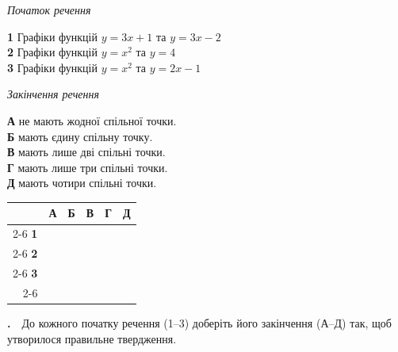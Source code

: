 \documentclass[12pt]{article}
\newcommand{\matchingGrid}{%
    \begingroup
    \renewcommand{\arraystretch}{1.15}
    \setlength{\tabcolsep}{4pt}
    \footnotesize
    \begin{tabular}{r|c|c|c|c|c|}
         \multicolumn{1}{c}{} & \multicolumn{1}{c}{\textbf{А}} & \multicolumn{1}{c}{\textbf{Б}} & \multicolumn{1}{c}{\textbf{В}} & \multicolumn{1}{c}{\textbf{Г}} & \multicolumn{1}{c}{\textbf{Д}} \\ \cline{2-6}
         \textbf{1} & \phantom{X} & \phantom{X} & \phantom{X} & \phantom{X} & \phantom{X} \\ \cline{2-6}
         \textbf{2} & & & & & \\ \cline{2-6}
         \textbf{3} & & & & & \\ \cline{2-6}
    \end{tabular}
    \endgroup
}
\newcounter{zad}
\newcommand{\zadnum}{\stepcounter{zad}\textbf{\thezad.}\ \ }
\begin{document}
\vspace{0.3cm}
\noindent
\begin{minipage}[t]{0.42\textwidth}
\textit{Початок речення}\par\vspace{0.2cm}
\textbf{1} \quad Графіки функцій $y = 3x + 1$ та $y = 3x - 2$\\[0.3cm]
\textbf{2} \quad Графіки функцій $y = x^2$ та $y = 4$\\[0.3cm]
\textbf{3} \quad Графіки функцій $y = x^2$ та $y = 2x - 1$
\end{minipage}
\hfill
\begin{minipage}[t]{0.42\textwidth}
\textit{Закінчення речення}\par\vspace{0.2cm}
\textbf{А} \quad не мають жодної спільної точки.\\[0.15cm]
\textbf{Б} \quad мають єдину спільну точку.\\[0.15cm]
\textbf{В} \quad мають лише дві спільні точки.\\[0.15cm]
\textbf{Г} \quad мають лише три спільні точки.\\[0.15cm]
\textbf{Д} \quad мають чотири спільні точки.
\end{minipage}
\hfill
\begin{minipage}[t]{0.14\textwidth}
\vspace{0.5cm}
\begin{flushright}\matchingGrid\end{flushright}
\end{minipage}

\vspace{0.5cm}
\noindent\zadnum До кожного початку речення (1--3) доберіть його закінчення (А--Д) так, щоб утворилося правильне твердження.
\end{document}
